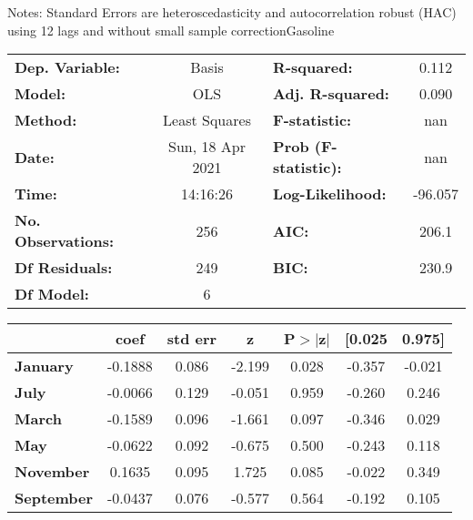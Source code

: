Notes: \newline
 [1] Standard Errors are heteroscedasticity and autocorrelation robust (HAC) using 12 lags and without small sample correctionGasoline\begin{center}
\begin{tabular}{lclc}
\toprule
\textbf{Dep. Variable:}    &      Basis       & \textbf{  R-squared:         } &     0.112   \\
\textbf{Model:}            &       OLS        & \textbf{  Adj. R-squared:    } &     0.090   \\
\textbf{Method:}           &  Least Squares   & \textbf{  F-statistic:       } &       nan   \\
\textbf{Date:}             & Sun, 18 Apr 2021 & \textbf{  Prob (F-statistic):} &      nan    \\
\textbf{Time:}             &     14:16:26     & \textbf{  Log-Likelihood:    } &   -96.057   \\
\textbf{No. Observations:} &         256      & \textbf{  AIC:               } &     206.1   \\
\textbf{Df Residuals:}     &         249      & \textbf{  BIC:               } &     230.9   \\
\textbf{Df Model:}         &           6      & \textbf{                     } &             \\
\bottomrule
\end{tabular}
\begin{tabular}{lcccccc}
                   & \textbf{coef} & \textbf{std err} & \textbf{z} & \textbf{P$> |$z$|$} & \textbf{[0.025} & \textbf{0.975]}  \\
\midrule
\textbf{January}   &      -0.1888  &        0.086     &    -2.199  &         0.028        &       -0.357    &       -0.021     \\
\textbf{July}      &      -0.0066  &        0.129     &    -0.051  &         0.959        &       -0.260    &        0.246     \\
\textbf{March}     &      -0.1589  &        0.096     &    -1.661  &         0.097        &       -0.346    &        0.029     \\
\textbf{May}       &      -0.0622  &        0.092     &    -0.675  &         0.500        &       -0.243    &        0.118     \\
\textbf{November}  &       0.1635  &        0.095     &     1.725  &         0.085        &       -0.022    &        0.349     \\
\textbf{September} &      -0.0437  &        0.076     &    -0.577  &         0.564        &       -0.192    &        0.105     \\

\end{tabular}
\end{center}
